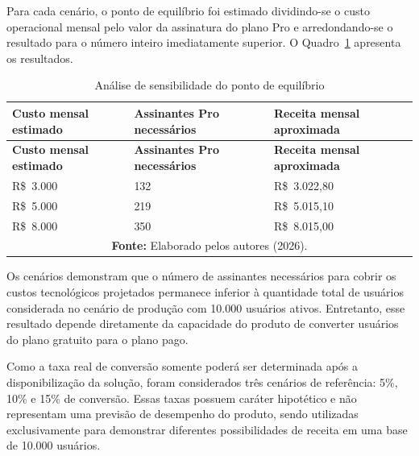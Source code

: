 Para cada cenário, o ponto de equilíbrio foi estimado dividindo-se o custo operacional mensal pelo valor da assinatura do plano Pro e arredondando-se o resultado para o número inteiro imediatamente superior. O Quadro~\ref{quad:break_even} apresenta os resultados.

{\small
\begin{longtable}{|p{4cm}|p{4.5cm}|p{5cm}|}
\caption{Análise de sensibilidade do ponto de equilíbrio}
\label{quad:break_even} \\

\hline
\textbf{Custo mensal estimado} &
\textbf{Assinantes Pro necessários} &
\textbf{Receita mensal aproximada} \\ \hline
\endfirsthead

\hline
\textbf{Custo mensal estimado} &
\textbf{Assinantes Pro necessários} &
\textbf{Receita mensal aproximada} \\ \hline
\endhead

R\$~3.000 &
132 &
R\$~3.022,80 \\ \hline

R\$~5.000 &
219 &
R\$~5.015,10 \\ \hline

R\$~8.000 &
350 &
R\$~8.015,00 \\ \hline

\multicolumn{3}{c}{\fontsize{10pt}{10pt}\selectfont \textbf{Fonte:} Elaborado pelos autores (2026).} \\

\end{longtable}
}

Os cenários demonstram que o número de assinantes necessários para cobrir os custos tecnológicos projetados permanece inferior à quantidade total de usuários considerada no cenário de produção com 10.000 usuários ativos. Entretanto, esse resultado depende diretamente da capacidade do produto de converter usuários do plano gratuito para o plano pago.

Como a taxa real de conversão somente poderá ser determinada após a disponibilização da solução, foram considerados três cenários de referência: 5\%, 10\% e 15\% de conversão. Essas taxas possuem caráter hipotético e não representam uma previsão de desempenho do produto, sendo utilizadas exclusivamente para demonstrar diferentes possibilidades de receita em uma base de 10.000 usuários.

